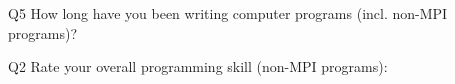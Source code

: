 \begin{description}%
\item{Q5} How long have you been writing computer programs (incl. non-MPI programs)?%
\item{Q2} Rate your overall programming skill (non-MPI programs):%
\end{description}%
